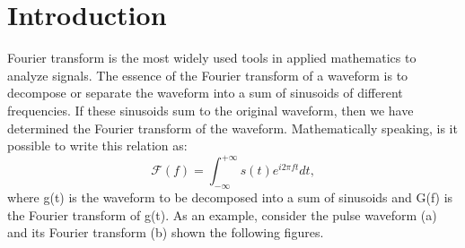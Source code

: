 \documentclass[a4paper,12pt]{article}
\begin{document}
\section*{Introduction}
Fourier transform is the most widely used tools in applied mathematics
to analyze signals. The essence of the Fourier transform of a waveform is to decompose
or separate the waveform into a sum of sinusoids of different frequencies.
If these sinusoids sum to the original waveform, then we have determined
the Fourier transform of the waveform.
Mathematically speaking, is it possible to write this relation as:
$$
\mathcal{F}(f) = \int_{-\infty}^{+\infty} s(t) e^{i2\pi f t} dt,
$$
where g(t) is the waveform to be decomposed into a sum of sinusoids
and G(f) is the Fourier transform of g(t).
As an example, consider the
pulse waveform (a) and its Fourier transform (b) shown the following figures.
\end{document}
